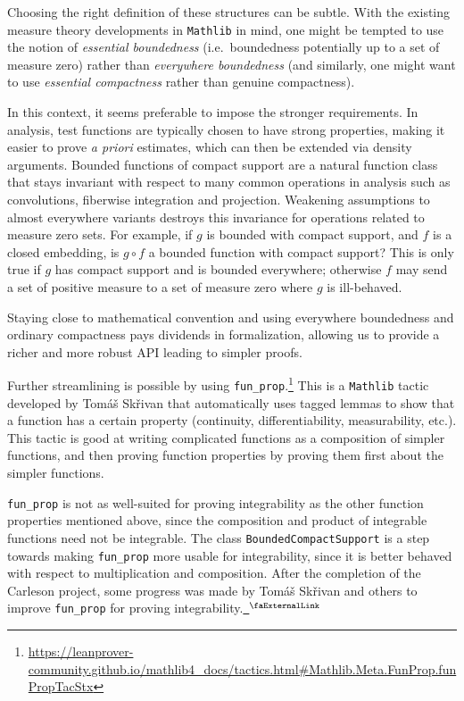 \documentclass[12pt, reqno]{amsart}
\let\lean\lstinline
\newcommand{\mathlib}{\texttt{Mathlib}\xspace}
\newcommand{\extlink}{~\ensuremath{{}^\text{\faExternalLink}}}
\theoremstyle{definition}
\theoremstyle{plain}
\begin{document}
Choosing the right definition of these structures can be subtle. With the
existing measure theory developments in \mathlib in mind, one might be tempted
to use the notion of {\em essential boundedness} (i.e.\ boundedness
potentially up to a set of measure zero) rather than {\em everywhere
boundedness} (and similarly, one might want to use {\em essential
compactness} rather than genuine compactness).

In this context, it seems preferable to impose the stronger requirements. In analysis, test functions
are typically chosen to have strong properties, making it easier to prove {\em a priori} estimates,
which can then be extended via density arguments.
Bounded functions of compact support are a natural function class that stays invariant with respect
to many common operations in analysis such as convolutions, fiberwise integration and projection.
Weakening assumptions to almost everywhere variants destroys this invariance for operations
related to measure zero sets.
For example, if $g$ is bounded with compact support, and $f$ is a closed embedding,
is $g\circ f$ a bounded function with compact support?
This is only true if $g$ has compact support and is bounded everywhere;
otherwise $f$ may send a set of positive measure to a set of measure zero where $g$ is ill-behaved.

Staying close to mathematical convention and using everywhere boundedness and ordinary compactness
pays dividends in formalization, allowing us to provide a richer and more robust API leading
to simpler proofs.

Further streamlining is possible by using \lean{fun_prop}.\footnote{\url{https://leanprover-community.github.io/mathlib4_docs/tactics.html\#Mathlib.Meta.FunProp.funPropTacStx}}
This is a \mathlib tactic developed by Tomáš Skřivan
that automatically uses tagged lemmas to show that a function has a certain property
(continuity, differentiability, measurability, etc.).
This tactic is good at writing complicated functions as a composition of simpler functions,
and then proving function properties by proving them first about the simpler functions.

\lean{fun_prop} is not as well-suited for proving integrability
as the other function properties mentioned above,
since the composition and product of integrable functions need not be integrable.
The class \lean{BoundedCompactSupport} is a step towards
making \texttt{fun\_prop} more usable for integrability,
since it is better behaved with respect to multiplication and composition.
After the completion of the Carleson project, some progress was made by Tomáš Skřivan and others to improve \lean{fun_prop} for proving integrability.\href{https://github.com/leanprover-community/mathlib4/pull/39323}{\extlink}
\end{document}
